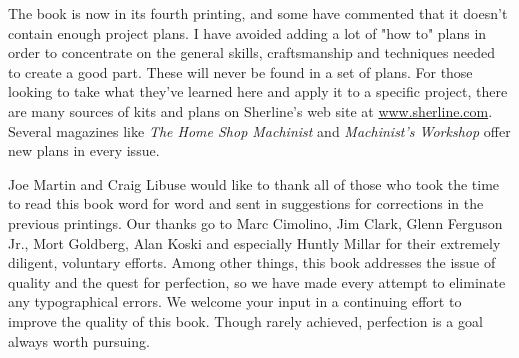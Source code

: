 The book is now in its fourth printing, and some have commented that it doesn't
contain enough project plans. I have avoided adding a lot of "how to" plans in
order to concentrate on the general skills, craftsmanship and techniques needed
to create a good part. These will never be found in a set of plans. For those
looking to take what they've learned here and apply it to a specific project,
there are many sources of kits and plans on Sherline's web site at
\url{www.sherline.com}. Several magazines like \textit{The Home Shop Machinist}
and \textit{Machinist's Workshop} offer new plans in every issue.


Joe Martin and Craig Libuse would like to thank all of those who took the time
to read this book word for word and sent in suggestions for corrections in the
previous printings. Our thanks go to Marc Cimolino, Jim Clark, Glenn Ferguson
Jr., Mort Goldberg, Alan Koski and especially Huntly Millar for their extremely
diligent, voluntary efforts. Among other things, this book addresses the issue
of quality and the quest for perfection, so we have made every attempt to
eliminate any typographical errors. We welcome your input in a continuing effort
to improve the quality of this book. Though rarely achieved, perfection is a
goal always worth pursuing.

\secup
\secup
